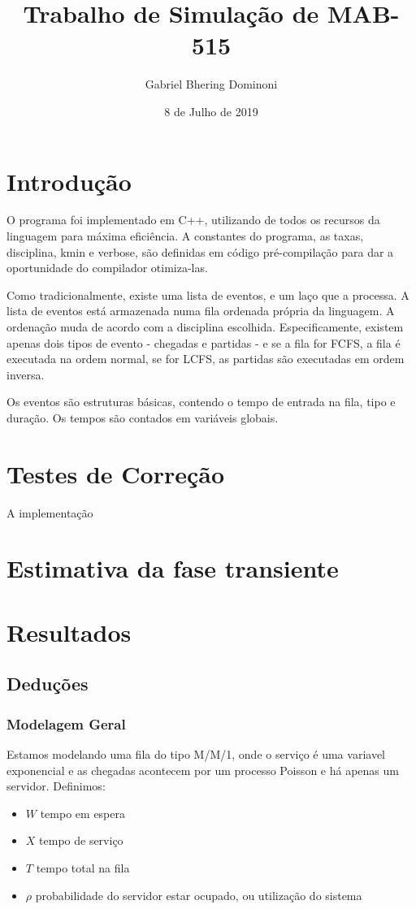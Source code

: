 \documentclass{article}
\title{Trabalho de Simulação de MAB-515}
\author{ Gabriel Bhering Dominoni }
\date{8 de Julho de 2019}
\begin{document}
\maketitle
\thispagestyle{empty}

\pagebreak

\tableofcontents

\pagebreak

\section{Introdução}
O programa foi implementado em C++, utilizando de todos os recursos da linguagem para máxima eficiência. A constantes do programa, as taxas, disciplina, kmin e verbose, são definidas em código pré-compilação para dar a oportunidade do compilador otimiza-las. 

Como tradicionalmente, existe uma lista de eventos, e um laço que a processa. A lista de eventos está armazenada numa fila ordenada própria da linguagem. A ordenação muda de acordo com a disciplina escolhida. Especificamente, existem apenas dois tipos de evento - chegadas e partidas - e se a fila for FCFS, a fila é executada na ordem normal, se for LCFS, as partidas são executadas em ordem inversa.

Os eventos são estruturas básicas, contendo o tempo de entrada na fila, tipo e duração. Os tempos são contados em variáveis globais.

\section{Testes de Correção}
A implementação 

\section{Estimativa da fase transiente}

\section{Resultados}

\subsection{Deduções}

\subsubsection{Modelagem Geral}
Estamos modelando uma fila do tipo M/M/1, onde o serviço é uma variavel exponencial e as chegadas acontecem por um processo Poisson e há apenas um servidor. Definimos: 
\begin{itemize} 
\item $W$ tempo em espera 
\item $X$ tempo de serviço  
\item $T$ tempo total na fila 
\item $\rho$ probabilidade do servidor estar ocupado, ou utilização do sistema
\end{itemize} 
\end{document}
